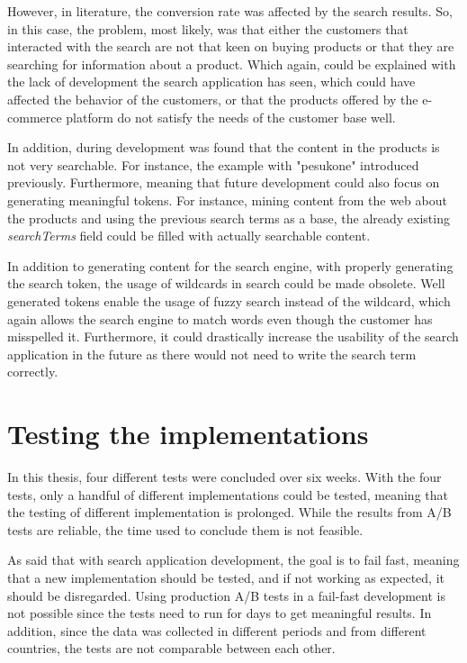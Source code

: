However, in literature, the conversion rate was affected by the search results. 
So, in this case, the problem, most likely, was that either the customers that interacted with the search 
are not that keen on buying products or that they are searching for information about a product.
Which again, could be explained with the lack of development the search application has seen, 
which could have affected the behavior of the customers, or 
that the products offered by the e-commerce platform do not satisfy the needs of the customer base well.

In addition, during development was found that the content in the products is not very searchable.
For instance, the example with "pesukone" introduced previously.
Furthermore, meaning that future development could also focus on generating meaningful tokens.
For instance, mining content from the web about the products and using the previous search terms as a base,
the already existing \emph{searchTerms} field could be filled with actually searchable content.

In addition to generating content for the search engine, with properly generating the search token,
the usage of wildcards in search could be made obsolete.
Well generated tokens enable the usage of fuzzy search instead of the wildcard, which again allows
the search engine to match words even though the customer has misspelled it.
Furthermore, it could drastically increase the usability of the search application in the future as there would not 
need to write the search term correctly.


\section{Testing the implementations}

In this thesis, four different tests were concluded over six weeks.
With the four tests, only a handful of different implementations could be tested, meaning that the testing
of different implementation is prolonged.
While the results from A/B tests are reliable, the time used to conclude them is not feasible.


As \citeauthor{relevantSearch} \cite{relevantSearch} said that with search application development, the goal
is to fail fast, meaning that a new implementation should be tested, and if not working as expected,
it should be disregarded. 
Using production A/B tests in a fail-fast development is not possible since the tests need to run for days
to get meaningful results.
In addition, since the data was collected in different periods and from different countries, the tests
are not comparable between each other.


